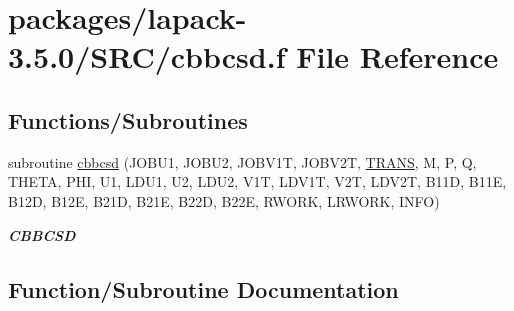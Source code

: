 \hypertarget{cbbcsd_8f}{}\section{packages/lapack-\/3.5.0/\+S\+R\+C/cbbcsd.f File Reference}
\label{cbbcsd_8f}
\subsection*{Functions/\+Subroutines}
\begin{DoxyCompactItemize}
\item 
subroutine \hyperlink{cbbcsd_8f_aa78ee3c0b2912f780622143726a5299e}{cbbcsd} (J\+O\+B\+U1, J\+O\+B\+U2, J\+O\+B\+V1\+T, J\+O\+B\+V2\+T, \hyperlink{superlu__enum__consts_8h_a0c4e17b2d5cea33f9991ccc6a6678d62a1f61e3015bfe0f0c2c3fda4c5a0cdf58}{T\+R\+A\+N\+S}, M, P, Q, T\+H\+E\+T\+A, P\+H\+I, U1, L\+D\+U1, U2, L\+D\+U2, V1\+T, L\+D\+V1\+T, V2\+T, L\+D\+V2\+T, B11\+D, B11\+E, B12\+D, B12\+E, B21\+D, B21\+E, B22\+D, B22\+E, R\+W\+O\+R\+K, L\+R\+W\+O\+R\+K, I\+N\+F\+O)
\begin{DoxyCompactList}\small\item\em {\bfseries C\+B\+B\+C\+S\+D} \end{DoxyCompactList}\end{DoxyCompactItemize}


\subsection{Function/\+Subroutine Documentation}
\hypertarget{cbbcsd_8f_aa78ee3c0b2912f780622143726a5299e}{}
